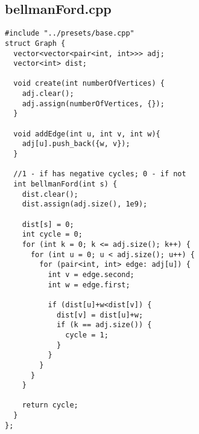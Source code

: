 \documentclass[11pt,landscape,twocolumn]{article}
\begin{document}
\subsection*{bellmanFord.cpp}
\begin{lstlisting}
#include "../presets/base.cpp"
struct Graph {
  vector<vector<pair<int, int>>> adj;
  vector<int> dist;

  void create(int numberOfVertices) {
    adj.clear();
    adj.assign(numberOfVertices, {});
  }

  void addEdge(int u, int v, int w){
    adj[u].push_back({w, v});
  }

  //1 - if has negative cycles; 0 - if not
  int bellmanFord(int s) {
    dist.clear();
    dist.assign(adj.size(), 1e9);
    
    dist[s] = 0;
    int cycle = 0;
    for (int k = 0; k <= adj.size(); k++) {
      for (int u = 0; u < adj.size(); u++) {
        for (pair<int, int> edge: adj[u]) {
          int v = edge.second;
          int w = edge.first;

          if (dist[u]+w<dist[v]) {
            dist[v] = dist[u]+w;
            if (k == adj.size()) {
              cycle = 1;
            }
          }
        }
      }
    }

    return cycle;
  }
};
 
\end{lstlisting}
\end{document}
